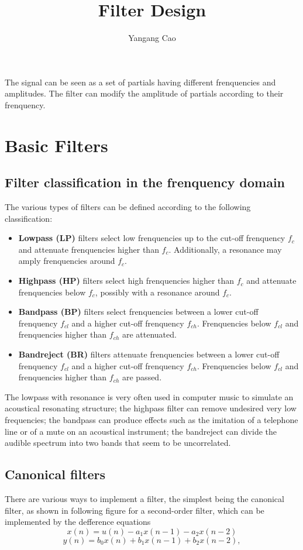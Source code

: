 \documentclass[10pt,a4paper,oneside]{article}
\author{Yangang Cao}
\begin{document}
\title{Filter Design}
\maketitle 

The signal can be seen as a set of partials having different frenquencies and amplitudes. The filter can modify the amplitude of partials according to their frenquency.

\section{Basic Filters}
\subsection{Filter classification in the frenquency domain}

The various types of filters can be defined according to the following classification:

\begin{itemize}
	\item {\bfseries Lowpass (LP)} filters select low frenquencies up to the cut-off frenquency $f_c$ and attenuate frenquencies higher than $f_c$. Additionally, a resonance may amply frenquencies around $f_c$.
	\item {\bfseries Highpass (HP)} filters select high frenquencies higher than $f_c$ and attenuate frenquencies below $f_c$, possibly with a resonance around $f_c$.
	\item {\bfseries Bandpass (BP)} filters select frenquencies between a lower cut-off frenquency $f_{cl}$ and a higher cut-off frenquency $f_{ch}$. Frenquencies below $f_{cl}$ and frenquencies higher than $f_{ch}$ are attenuated.
	\item {\bfseries Bandreject (BR)} filters attenuate frenquencies between a lower cut-off frenquency $f_{cl}$ and a higher cut-off frenquency $f_{ch}$. Frenquencies below $f_{cl}$ and frenquencies higher than $f_{ch}$ are passed.
\end{itemize}

The lowpass with resonance is very often used in computer music to simulate an acoustical resonating structure; the highpass filter can remove undesired very low frequencies; the bandpass can produce effects such as the imitation of a telephone line or of a mute on an acoustical instrument; the bandreject can divide the audible spectrum into two bands that seem to be uncorrelated.

\subsection{Canonical filters}
There are various ways to implement a filter, the simplest being the canonical filter, as shown in following figure for a second-order filter, which can be implemented by the defference equations
\[
x(n) = u(n) - a_1x(n-1) - a_2x(n-2)
\]
\[
y(n) = b_0x(n) + b_1x(n-1) + b_2x(n-2),
\]
\end{document}
